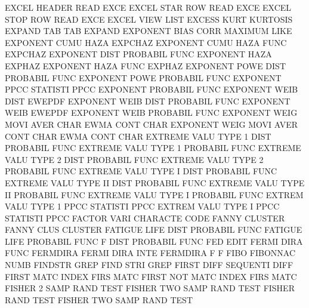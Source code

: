 EXCEL    HEADER                         READ     EXCE
EXCEL    STAR ROW                       READ     EXCE
EXCEL    STOP ROW                       READ     EXCE
EXCEL    VIEW                           LIST
EXCESS   KURT                           KURTOSIS
EXPAND   TAB                            TAB      EXPAND
EXPONENT BIAS CORR                      MAXIMUM  LIKE
EXPONENT CUMU HAZA                      EXPCHAZ
EXPONENT CUMU HAZA FUNC                 EXPCHAZ
EXPONENT DIST                           PROBABIL FUNC
EXPONENT HAZA                           EXPHAZ
EXPONENT HAZA FUNC                      EXPHAZ
EXPONENT POWE DIST                      PROBABIL FUNC
EXPONENT POWE                           PROBABIL FUNC
EXPONENT PPCC                           STATISTI PPCC
EXPONENT                                PROBABIL FUNC
EXPONENT WEIB DIST                      EWEPDF
EXPONENT WEIB DIST                      PROBABIL FUNC
EXPONENT WEIB                           EWEPDF
EXPONENT WEIB                           PROBABIL FUNC
EXPONENT WEIG MOVI AVER CHAR            EWMA     CONT CHAR
EXPONENT WEIG MOVI AVER CONT CHAR       EWMA     CONT CHAR
EXTREME  VALU TYPE 1    DIST            PROBABIL FUNC
EXTREME  VALU TYPE 1                    PROBABIL FUNC
EXTREME  VALU TYPE 2    DIST            PROBABIL FUNC
EXTREME  VALU TYPE 2                    PROBABIL FUNC
EXTREME  VALU TYPE I    DIST            PROBABIL FUNC
EXTREME  VALU TYPE II   DIST            PROBABIL FUNC
EXTREME  VALU TYPE II                   PROBABIL FUNC
EXTREME  VALU TYPE I                    PROBABIL FUNC
EXTREM   VALU TYPE 1    PPCC            STATISTI PPCC
EXTREM   VALU TYPE I    PPCC            STATISTI PPCC
FACTOR   VARI                           CHARACTE CODE
FANNY                                   CLUSTER
FANNY    CLUS                           CLUSTER
FATIGUE  LIFE DIST                      PROBABIL FUNC
FATIGUE  LIFE                           PROBABIL FUNC
F        DIST                           PROBABIL FUNC
FED                                     EDIT
FERMI    DIRA FUNC                      FERMDIRA
FERMI    DIRA INTE                      FERMDIRA
F                                       F
FIBO                                    FIBONNAC NUMB
FINDSTR                                 GREP
FIND     STRI                           GREP
FIRST    DIFF                           SEQUENTI DIFF
FIRST    MATC                           INDEX    FIRS MATC
FIRST    NOT  MATC                      INDEX    FIRS MATC
FISHER   2    SAMP RAND TEST            FISHER   TWO  SAMP RAND TEST
FISHER   RAND TEST                      FISHER   TWO  SAMP RAND TEST

